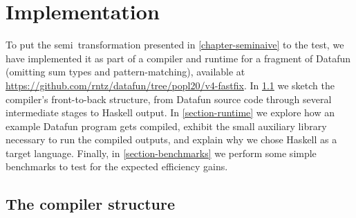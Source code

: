 \section{Implementation}
\label{section-implementation}

To put the semi\naive\ transformation presented in \cref{chapter-seminaive} to the test, we have implemented it as part of a compiler and runtime for a fragment of Datafun (omitting sum types and pattern-matching), available at \url{https://github.com/rntz/datafun/tree/popl20/v4-fastfix}.
%
In \cref{section-compiler} we sketch the compiler's front-to-back structure, from Datafun source code through several intermediate stages to Haskell output.
%
In \cref{section-runtime} we explore how an example Datafun program gets compiled, exhibit the small auxiliary library necessary to run the compiled outputs, and explain why we chose Haskell as a target language.
%
%
Finally, in \cref{section-benchmarks} we perform some simple benchmarks to test for the expected efficiency gains.




\subsection{The compiler structure}\label{section-compiler}

